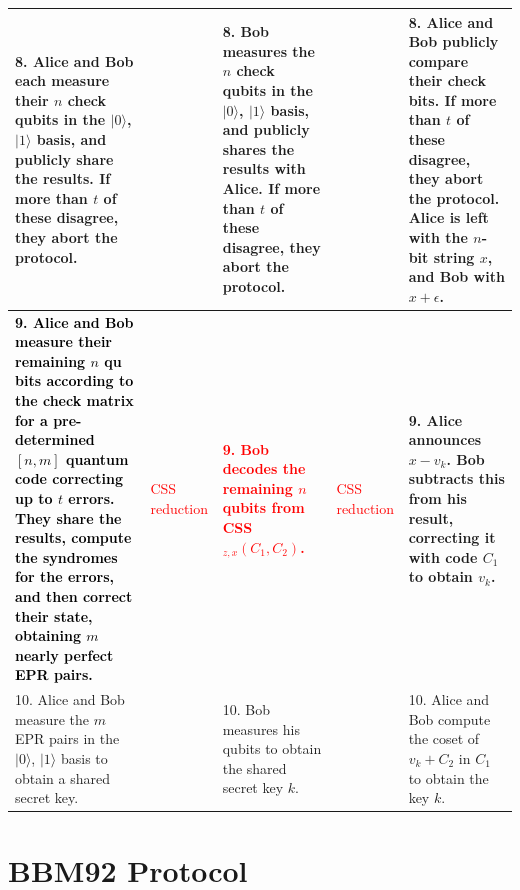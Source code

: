 \documentclass{report}
\theoremstyle{defn_style}
\begin{document}
\begin{center}
\begin{longtable}{|p{4cm}|p{1.8cm}|p{4cm}|p{2cm}|p{4cm}|}
8. Alice and Bob each measure their $n$ check qubits in the $|0\rangle$, $|1\rangle$ basis, and publicly share the results. If more than $t$ of these disagree, they abort the protocol. & & 
8. Bob measures the $n$ check qubits in the $|0\rangle$, $|1\rangle$ basis, and publicly shares the results with Alice. If more than $t$ of these disagree, they abort the protocol. & & 
8. Alice and Bob publicly compare their check bits. If more than $t$ of these disagree, they abort the protocol. Alice is left with the $n$-bit string $x$, and Bob with $x + \epsilon$. \\
\hline
\textbf{\textcolor{black}{9. Alice and Bob measure their remaining $n$ qu
bits according to the check matrix for a pre-determined $[n, m]$ quantum code correcting up to $t$ errors. They share the results, compute the syndromes for the errors, and then correct their state, obtaining $m$ nearly perfect EPR pairs.}} &\textcolor{red}{CSS reduction} & 
\textbf{\textcolor{red}{9. Bob decodes the remaining $n$ qubits from CSS$_{z,x}(C_1, C_2)$. }} &\textcolor{red}{CSS reduction} & 
\textbf{{9. Alice announces $x - v_k$. Bob subtracts this from his result, correcting it with code $C_1$ to obtain $v_k$. }} \\
\hline
10. Alice and Bob measure the $m$ EPR pairs in the $|0\rangle$, $|1\rangle$ basis to obtain a shared secret key. & & 
10. Bob measures his qubits to obtain the shared secret key $k$. & & 
10. Alice and Bob compute the coset of $v_k + C_2$ in $C_1$ to obtain the key $k$. \\
\hline
\end{longtable}
\end{center}

\section{BBM92 Protocol}
\end{document}

